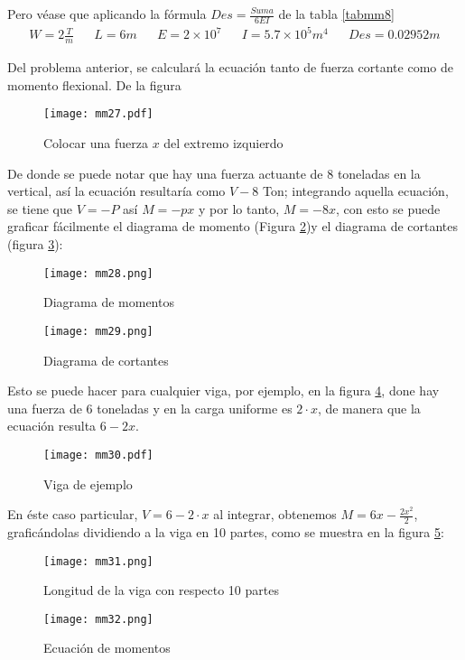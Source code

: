 Pero véase que aplicando la fórmula $Des=\frac{Suma}{6EI}$ de la tabla \ref{tabmm8}
\begin{align*}
    W = 2 \frac{T}{m}&& L = 6m&&E = 2\times 10^7&& I = 5.7\times 10^{ 5}m^4&&Des = 0.02952m
\end{align*}


Del problema anterior, se calculará la ecuación tanto de fuerza cortante como de momento flexional.
De la figura
\begin{figure}[h!]
\centering
  \texttt{[image: mm27.pdf]}
  \caption{Colocar una fuerza $x$ del extremo izquierdo}
  \label{mm27}
\end{figure}
De donde se puede notar que hay una fuerza actuante de 8 toneladas en la vertical, así la ecuación resultaría como $V-8$ Ton;
integrando aquella ecuación, se tiene que $V=-P$ así $M=-px$ y por lo tanto, $M=-8x$,
con esto se puede graficar fácilmente el diagrama de momento (Figura \ref{mm28})y el diagrama de cortantes (figura \ref{mm29}):
\begin{figure}[h!]
\centering
  \texttt{[image: mm28.png]}
  \caption{Diagrama de momentos}
  \label{mm28}
\end{figure}
\begin{figure}[h!]
\centering
  \texttt{[image: mm29.png]}
  \caption{Diagrama de cortantes}
  \label{mm29}
\end{figure}
Esto se puede hacer para cualquier viga, por ejemplo, en la figura \ref{mm30}, done hay una fuerza de 6 toneladas y en la carga uniforme es $2\cdot x$, de manera que la ecuación resulta $6-2x$.
\begin{figure}[h!]
\centering
  \texttt{[image: mm30.pdf]}
  \caption{Viga de ejemplo}
  \label{mm30}
\end{figure}
En éste caso particular, $V=6-2\cdot x$ al integrar, obtenemos $M=6x-\frac{2x^2}{2}$, graficándolas dividiendo a la viga en 10 partes, como se muestra en la figura \ref{mm31}:
\begin{figure}[h!]
\centering
  \texttt{[image: mm31.png]}
  \caption{Longitud de la viga con respecto 10 partes}
  \label{mm31}
\end{figure}
\begin{figure}[h!]
\centering
  \texttt{[image: mm32.png]}
  \caption{Ecuación de momentos}
  \label{mm32}
\end{figure}
